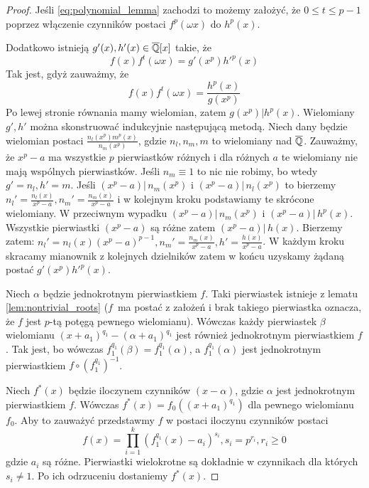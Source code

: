 \begin{proof}
  Jeśli \ref{eq:polynomial_lemma} zachodzi to możemy założyć, że $0 \leq t \leq
  p - 1$ poprzez włączenie czynników postaci $f^p(\omega x)$ do $h^p(x)$.

  Dodatkowo istnieją $g'(x), h'(x) \in \overline{\mathbb{Q}}[x]$ takie, że
  \begin{equation}
    f(x) f^t(\omega x) = g' \left( x^p \right) h'^p(x)
    \label{eq:polynomial_lemma_right}
  \end{equation}
  Tak jest, gdyż zauważmy, że
  \[ f(x) f^t(\omega x) = \frac{h^p(x)}{g \left( x^p \right)} \]
  Po lewej stronie równania mamy wielomian, zatem $g \left( x^p \right) |
  h^p(x)$. Wielomiany $g', h'$ można skonstruować indukcyjnie następującą
  metodą. Niech dany będzie wielomian postaci
  $\frac{n_l \left( x^p \right) m^p(x)}{n_m \left( x^p \right)}$, gdzie $n_l,
  n_m, m$ to wielomiany nad $\overline{\mathbb{Q}}$. Zauważmy, że $x^p - a$ ma wszystkie
  $p$ pierwiastków różnych i dla różnych $a$ te wielomiany nie mają wspólnych
  pierwiastków. Jeśli $n_m \equiv 1$ to nic nie robimy, bo wtedy $g' = n_l, h' =
  m$.
  Jeśli $\left(x^p - a \right) | \, n_m \left(x^p\right)$ i $\left(x^p - a
  \right) | \, n_l \left(x^p\right)$ to bierzemy
  $n_l' = \frac{n_l(x)}{x^p - a}, n_m' = \frac{n_m(x)}{x^p - a}$ i w kolejnym
  kroku podstawiamy te skrócone wielomiany.
  W przeciwnym wypadku
  $\left(x^p - a \right) | \, n_m \left(x^p \right)$ i
  $\left(x^p - a \right) | \, h^p \left(x \right)$. Wszystkie pierwiastki
  $\left(x^p - a \right)$ są różne zatem $\left(x^p - a \right) | \, h(x)$.
  Bierzemy zatem:
  $n_l' = n_l(x)\left(x^p - a \right)^{p-1}, n_m' = \frac{n_m(x)}{x^p -
  a}, h' = \frac{h(x)}{x^p - a}$.
  W każdym kroku skracamy mianownik z kolejnych dzielników zatem w końcu
  uzyskamy żądaną postać $g'\left(x^p \right) h'^p(x)$.

  Niech $\alpha$ będzie jednokrotnym pierwiastkiem $f$. Taki pierwiastek
  istnieje z lematu \ref{lem:nontrivial_roots} ($f$~ma postać z założeń i brak
  takiego pierwiastka oznacza, że $f$ jest $p$-tą potęgą pewnego wielomianu).
  Wówczas każdy pierwiastek $\beta$ wielomianu $\left(x + a_1\right)^{q_1} -
  \left(\alpha + a_1\right)^{q_1}$ jest również jednokrotnym pierwiastkiem $f$.
  Tak jest, bo wówczas $f_1^{q_1}(\beta) = f_1^{q_1}(\alpha)$, a $f_1^{q_1}(\alpha)$ jest
  jednokrotnym pierwiastkiem $f \circ \left(f_1^{q_1}\right)^{-1}$.

  Niech $f^*(x)$ będzie iloczynem czynników $(x-\alpha)$, gdzie $\alpha$ jest
  jednokrotnym pierwiastkiem $f$. Wówczas $f^*(x) = f_0 \left( \left(x + a_1
  \right)^{q_1} \right)$ dla pewnego wielomianu $f_0$. Aby to zauważyć
  przedstawmy $f$ w postaci iloczynu czynników postaci
  \[ f(x) = \prod_{i=1}^k \left(f_1^{q_1}(x) - a_i\right)^{s_i},
  s_i = p^{r_i}, r_i \geq 0\]
  gdzie $a_i$ są różne. Pierwiastki wielokrotne są dokładnie w czynnikach dla
  których $s_i \neq 1$. Po ich odrzuceniu dostaniemy $f^*(x)$.



\end{proof}
